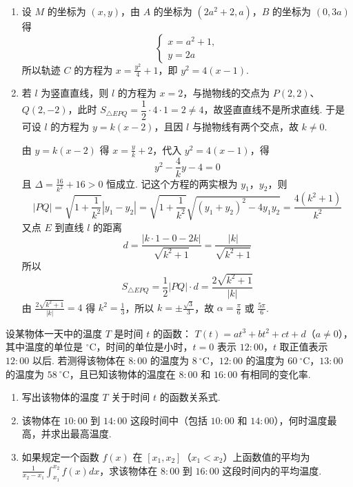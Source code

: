 \begin{solution}
\begin{enumerate}
\item 设 \(M\) 的坐标为 \((x,y)\)，由 \(A\) 的坐标为 \((2a^{2}+2,a)\)，\(B\) 的坐标为 \((0,3a)\) 得
\[
\begin{cases}
x=a^{2}+1,\\
y=2a
\end{cases}
\]
所以轨迹 \(C\) 的方程为 \(x=\frac{y^{2}}{4}+1\)，即 \(y^{2}=4(x-1)\).

\item
若 \(l\) 为竖直直线，则 \(l\) 的方程为 \(x=2\)，与抛物线的交点为 \(P(2,2)\)、\(Q(2,-2)\)，此时 \(S_{\triangle EPQ}=\dfrac12\cdot4\cdot1=2\ne4\)，故竖直直线不是所求直线. 于是可设 \(l\) 的方程为 \(y=k(x-2)\)，且因 \(l\) 与抛物线有两个交点，故 \(k\neq0\).


由 \(y=k(x-2)\) 得 \(x=\frac{y}{k}+2\)，代入 \(y^{2}=4(x-1)\)，得
\[
y^{2}-\frac{4}{k}y-4=0
\]
且 \(\Delta=\frac{16}{k^{2}}+16>0\) 恒成立. 记这个方程的两实根为 \(y_{1}\)，\(y_{2}\)，则
\[
|PQ|=\sqrt{1+\frac{1}{k^{2}}}|y_{1}-y_{2}|
=\sqrt{1+\frac{1}{k^{2}}}\sqrt{(y_{1}+y_{2})^{2}-4y_{1}y_{2}}
=\frac{4(k^{2}+1)}{k^{2}}
\]
又点 \(E\) 到直线 \(l\) 的距离
\[
d=\frac{|k\cdot1-0-2k|}{\sqrt{k^{2}+1}}=\frac{|k|}{\sqrt{k^{2}+1}}
\]
所以
\[
S_{\triangle EPQ}=\frac{1}{2}|PQ|\cdot d=\frac{2\sqrt{k^{2}+1}}{|k|}
\]
由 \(\frac{2\sqrt{k^{2}+1}}{|k|}=4\) 得 \(k^{2}=\frac{1}{3}\)，所以 \(k=\pm\frac{\sqrt{3}}{3}\)，故 \(\alpha=\frac{\pi}{6}\) 或 \(\frac{5\pi}{6}\).

\end{enumerate}
\end{solution}

\begin{problem}
设某物体一天中的温度 \(T\) 是时间 \(t\) 的函数： \(T(t) = at^{3} + bt^{2} + ct + d\)（\(a \neq 0\)），其中温度的单位是 \(^{\circ}\mathrm{C}\)，时间的单位是小时，\(t = 0\) 表示 \(12{:}00\)，\(t\) 取正值表示 \(12{:}00\) 以后. 若测得该物体在 \(8{:}00\) 的温度为 \(8\mathrm{~^{\circ}C}\)，\(12{:}00\) 的温度为 \(60\mathrm{~^{\circ}C}\)，\(13{:}00\) 的温度为 \(58\mathrm{~^{\circ}C}\)，且已知该物体的温度在 \(8{:}00\) 和 \(16{:}00\) 有相同的变化率.

\begin{enumerate}
\item 写出该物体的温度 \(T\) 关于时间 \(t\) 的函数关系式.
\item 该物体在 \(10{:}00\) 到 \(14{:}00\) 这段时间中（包括 \(10{:}00\) 和 \(14{:}00\)），何时温度最高，并求出最高温度.
\item 如果规定一个函数 \(f(x)\) 在 \([x_1, x_2]\)（\(x_1 < x_2\)）上函数值的平均为 \(\frac{1}{x_2 - x_1} \int_{x_1}^{x_2} f(x) dx\)，求该物体在 \(8{:}00\) 到 \(16{:}00\) 这段时间内的平均温度.
\end{enumerate}
\end{problem}

